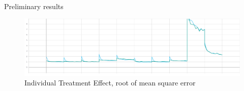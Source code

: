 \documentclass{beamer}
\begin{document}
    \begin{frame}{Preliminary results}
        \begin{figure}
            \centering
            \includegraphics[scale=0.2]{latex/Figures/Results/metrics_ite.png}
            \caption{Individual Treatment Effect, root of mean square error}
            \label{fig:my_label}
        \end{figure}
    \end{frame}	 
\end{document}
